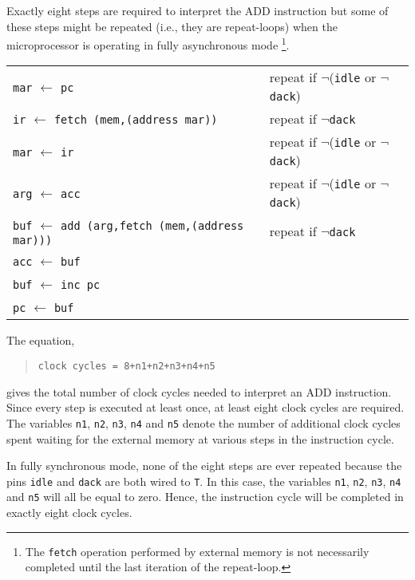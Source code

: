 Exactly eight steps are required to interpret the ADD instruction
but some of these steps might be repeated (i.e., they are repeat-loops)
when the microprocessor is operating in fully asynchronous mode
\footnote{
The \verb"fetch" operation performed by external
memory is not necessarily completed until the last iteration of
the repeat-loop.}.

\begin{center}
\begin{tabular}{ll}

\verb"mar" $\leftarrow$ \verb"pc" &
repeat if $\neg$(\verb"idle" or $\neg$\verb"dack")\\

\verb"ir" $\leftarrow$ \verb"fetch (mem,(address mar))" &
repeat if $\neg$\verb"dack"\\

\verb"mar" $\leftarrow$ \verb"ir" &
repeat if $\neg$(\verb"idle" or $\neg$\verb"dack")\\

\verb"arg" $\leftarrow$ \verb"acc" &
repeat if $\neg$(\verb"idle" or $\neg$\verb"dack")\\

\verb"buf" $\leftarrow$ \verb"add (arg,fetch (mem,(address mar)))" &
repeat if $\neg$\verb"dack"\\

\verb"acc" $\leftarrow$ \verb"buf" & \\

\verb"buf" $\leftarrow$ \verb"inc pc" & \\

\verb"pc" $\leftarrow$ \verb"buf" & 

\end{tabular}
\end{center}

The equation,

\begin{quote}
\verb"clock cycles = 8+n1+n2+n3+n4+n5"
\end{quote}

\noindent
gives the total number of clock cycles
needed to interpret an ADD instruction.
Since every step is executed at least once,
at least eight clock cycles are required.
The variables \verb"n1", \verb"n2", \verb"n3", \verb"n4" and \verb"n5"
denote the number of additional clock cycles spent waiting for the
external memory at various steps in the instruction cycle.

In fully synchronous mode, none of the eight steps are ever repeated
because the pins \verb"idle" and \verb"dack" are both wired to \verb"T".
In this case,
the variables \verb"n1", \verb"n2", \verb"n3", \verb"n4" and \verb"n5"
will all be equal to zero.
Hence, the instruction cycle will be completed in exactly eight
clock cycles.

